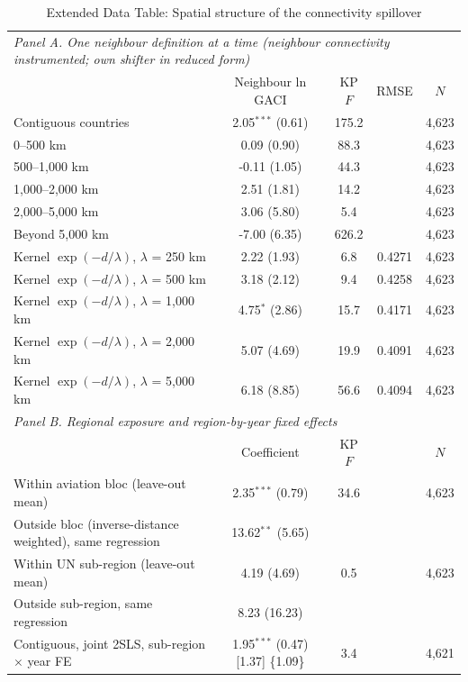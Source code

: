 \begin{table}[htbp]
\centering
\begin{threeparttable}
\caption{Extended Data Table: Spatial structure of the connectivity spillover}
\label{tab:spill_ext}
\scriptsize
\begin{tabular}{lcccc}
\toprule
\multicolumn{5}{l}{\textit{Panel A. One neighbour definition at a time (neighbour connectivity instrumented; own shifter in reduced form)}} \\
 & Neighbour ln GACI & KP $F$ & RMSE & $N$ \\
\midrule
  Contiguous countries & 2.05$^{***}$ (0.61) & 175.2 & & 4,623 \\
  0--500 km & 0.09 (0.90) & 88.3 & & 4,623 \\
  500--1,000 km & -0.11 (1.05) & 44.3 & & 4,623 \\
  1,000--2,000 km & 2.51 (1.81) & 14.2 & & 4,623 \\
  2,000--5,000 km & 3.06 (5.80) & 5.4 & & 4,623 \\
  Beyond 5,000 km & -7.00 (6.35) & 626.2 & & 4,623 \\
  Kernel $\exp(-d/\lambda)$, $\lambda$ = 250 km & 2.22 (1.93) & 6.8 & 0.4271 & 4,623 \\
  Kernel $\exp(-d/\lambda)$, $\lambda$ = 500 km & 3.18 (2.12) & 9.4 & 0.4258 & 4,623 \\
  Kernel $\exp(-d/\lambda)$, $\lambda$ = 1,000 km & 4.75$^{*}$ (2.86) & 15.7 & 0.4171 & 4,623 \\
  Kernel $\exp(-d/\lambda)$, $\lambda$ = 2,000 km & 5.07 (4.69) & 19.9 & 0.4091 & 4,623 \\
  Kernel $\exp(-d/\lambda)$, $\lambda$ = 5,000 km & 6.18 (8.85) & 56.6 & 0.4094 & 4,623 \\
\midrule
\multicolumn{5}{l}{\textit{Panel B. Regional exposure and region-by-year fixed effects}} \\
 & Coefficient & KP $F$ & & $N$ \\
  Within aviation bloc (leave-out mean) & 2.35$^{***}$ (0.79) & 34.6 & & 4,623 \\
  Outside bloc (inverse-distance weighted), same regression & 13.62$^{**}$ (5.65) & & & \\
  Within UN sub-region (leave-out mean) & 4.19 (4.69) & 0.5 & & 4,623 \\
  Outside sub-region, same regression & 8.23 (16.23) & & & \\
  Contiguous, joint 2SLS, sub-region $\times$ year FE & 1.95$^{***}$ (0.47) [1.37] \{1.09\} & 3.4 & & 4,621 \\

\end{tabular}
\end{threeparttable}
\end{table}
